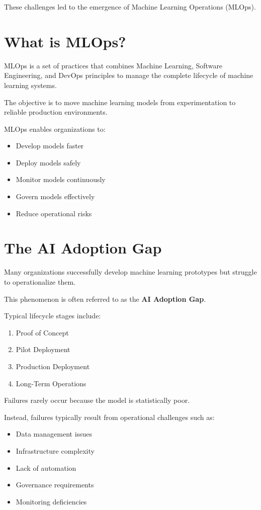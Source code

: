 These challenges led to the emergence of Machine Learning Operations (MLOps).

\section{What is MLOps?}

MLOps is a set of practices that combines Machine Learning, Software Engineering, and DevOps principles to manage the complete lifecycle of machine learning systems.

The objective is to move machine learning models from experimentation to reliable production environments.

MLOps enables organizations to:

\begin{itemize}
    \item Develop models faster
    \item Deploy models safely
    \item Monitor models continuously
    \item Govern models effectively
    \item Reduce operational risks
\end{itemize}

\section{The AI Adoption Gap}

Many organizations successfully develop machine learning prototypes but struggle to operationalize them.

This phenomenon is often referred to as the \textbf{AI Adoption Gap}.

Typical lifecycle stages include:

\begin{enumerate}
    \item Proof of Concept
    \item Pilot Deployment
    \item Production Deployment
    \item Long-Term Operations
\end{enumerate}

Failures rarely occur because the model is statistically poor.

Instead, failures typically result from operational challenges such as:

\begin{itemize}
    \item Data management issues
    \item Infrastructure complexity
    \item Lack of automation
    \item Governance requirements
    \item Monitoring deficiencies
\end{itemize}

